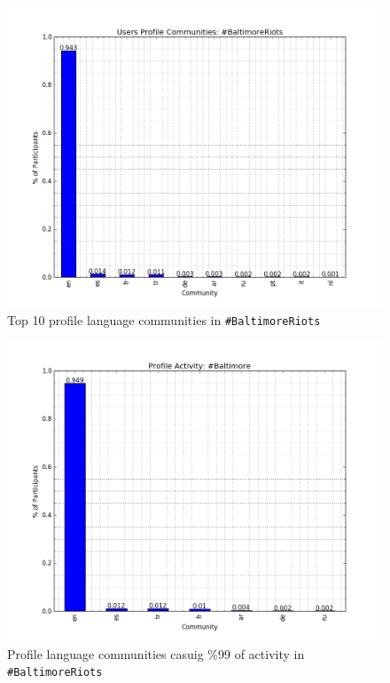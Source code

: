 \begin{figure}[htb]
\centering
\includegraphics[width=\columnwidth]{images/baltimore_profile_size.png}
\caption{Top 10 profile language communities in {\texttt{\#BaltimoreRiots}}}
\label{fig:baltimore_profile_size}
\end{figure}

\begin{figure}[htb]
\centering
\includegraphics[width=\columnwidth]{images/baltimore_profile_activity.png}
\caption{Profile language communities casuig \%99 of activity in {\texttt{\#BaltimoreRiots}}}
\label{fig:baltimore_profile_activity}
\end{figure}

